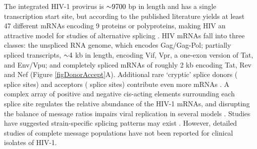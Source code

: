 \documentclass[../sherrill-Mix_thesis.tex]{subfiles}
\begin{document}
The integrated HIV-1 provirus is $\mathord{\sim}{}9700$ bp in length and has a single transcription start site, but according to the published literature yields at least 47 different mRNAs encoding 9 proteins or polyproteins, making HIV an attractive model for studies of alternative splicing \citep{Purcell1993}. HIV mRNAs fall into three classes: the unspliced RNA genome, which encodes Gag/Gag-Pol; partially spliced transcripts, $\mathord{\sim}{}4$ kb in length, encoding Vif, Vpr, a one-exon version of Tat, and Env/Vpu; and completely spliced mRNAs of roughly 2 kb encoding Tat, Rev and Nef (Figure \ref{figDonorAccept}A). Additional rare `cryptic' splice donors (\fivePrime{} splice sites) and acceptors (\threePrime{} splice sites) contribute even more mRNAs \citep{Benko1990,Carrera2010,Luetzelberger2006,Salfeld1990,Schwartz1990,Smith1992}. A complex array of positive and negative cis-acting elements surrounding each splice site regulates the relative abundance of the HIV-1 mRNAs, and disrupting the balance of message ratios impairs viral replication in several models \citep{Stoltzfus2009,Bakkour2007,Brass2008,Jablonski2009,Konig2008,Tranell2011,Zhou2008,Zhu2011}. Studies have suggested strain-specific splicing patterns may exist \citep{Purcell1993,Saltarelli1996,Delgado2012}. However, detailed studies of complete message populations have not been reported for clinical isolates of HIV-1. 
\end{document}
